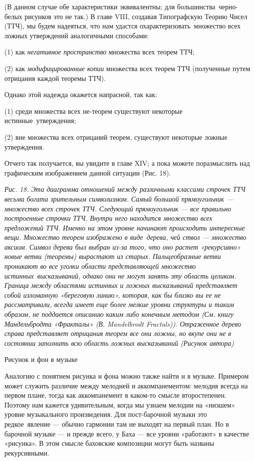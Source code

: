 (В данном случае обе характеристики эквивалентны; для большинства~черно-белых рисунков это не так.) В главе VIII, создавая Типографскую Теорию Чисел (ТТЧ), мы будем надеяться, что нам удастся охарактеризовать~множество всех ложных утверждений аналогичными способами:

(1) как \emph{негативное пространство} множества всех теорем ТТЧ;

(2) как \emph{модифицированные копии} множества всех теорем ТТЧ (полученные путем отрицания каждой теоремы ТТЧ).

Однако этой надежда окажется напрасной, так как:

(1) среди множества всех не-теорем существуют некоторые истинные~утверждения;

(2) вне множества всех отрицаний теорем, существуют некоторые ложные утверждения.

Отчего так получается, вы увидите в главе XIV; а пока можете поразмыслить над графическим изображением данной ситуации (Рис. 18).

\emph{Рис. 18. Эта диаграмма отношений между различными классами строчек ТТЧ весьма богата зрительным символизмом. Самый большой прямоугольник --- множество всех строчек ТТЧ. Следующий прямоугольник --- все правильно построенные строчки ТТЧ. Внутри него находится множество всех предложений ТТЧ. Именно на этом уровне начинают происходить интересные вещи. Множество теорем изображено в виде~дерева, чей ствол --- множество аксиом. Символ дерева был выбран из-за того, что оно растет «рекурсивно» новые ветви (теоремы) вырастают из старых. Пальцеобразные ветви проникают во все уголки области представляющей множество истинных~высказываний, однако они не могут занять эту область целиком. Граница между областями истинных и ложных высказываний представляет собой изломанную «береговую линию», которая, как бы близко вы ее не рассматривали, всегда имеет еще более мелкие уровни структуры и таким образом, не поддается описанию каким либо конечным методом (См. книгу Мандельбродта «Фракталы» (В. Mandelbrodt Fractals)). Отраженное дерево справа представляет отрицания теорем все они ложны, но вкупе они не в состоянии заполнить всю область ложных высказываний (Рисунок автора)}

Рисунок и фон в музыке

Аналогию с понятием рисунка и фона можно также найти и в музыке. Примером может служить различие между мелодией и аккомпанементом: мелодия всегда на первом плане, тогда как аккомпанемент в каком-то смысле второстепенен. Поэтому нам кажется удивительным, когда мы узнаем мелодии на «низшем» уровне музыкального произведения. Для пост-барочной музыки это редкое~явление --- обычно гармонии там не выходят на первый план. Но в барочной музыке --- и прежде всего, у Баха --- все уровни «работают» в качестве «рисунка». В этом смысле баховские композиции могут быть названы рекурсивными.

